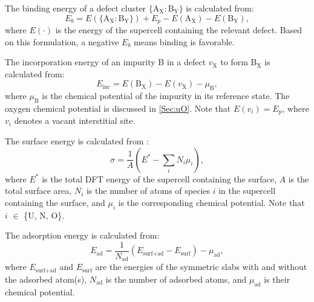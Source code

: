 \documentclass[preprint,12pt,sort&compress]{elsarticle}
\newcommand{\?}{\stackrel{?}{=}}
\begin{document}
The binding energy of a defect cluster $\{\text{A}_\text{X} \! : \! \text{B}_\text{Y}\}$ is calculated from:
\begin{equation}
E_b = E(\{\text{A}_\text{X} \! : \! \text{B}_\text{Y}\}) + E_p - E(\text{A}_\text{X}) - E(\text{B}_\text{Y}),
\end{equation}
where $E(\cdot)$ is the energy of the supercell containing the relevant defect. Based on this formulation, a negative $E_b$ means binding is favorable.

The incorporation energy of an impurity B in a defect $v_\text{X}$ to form B$_\text{X}$ is calculated from:
\begin{equation}
E_\text{inc} = E( \text{B}_\text{X} ) - E( v_\text{X} ) - \mu_\text{B},
\end{equation}
where $\mu_\text{B}$ is the chemical potential of the impurity in its reference state. The oxygen chemical potential is discussed in \cref{Sec:uO}. Note that $E( v_i ) = E_p$, where $v_i$ denotes a vacant interstitial site. %

The surface energy is calculated from \cite{Finnis2005}:
\begin{equation}
\sigma = \frac{1}{A} \left( E^* - \sum_{i} N_i \mu_i \right),
\label{Eq:Sigma}
\end{equation}
where $E^*$ is the total DFT energy of the supercell containing the surface, $A$ is the total surface area, $N_i$ is the number of atoms of species $i$ in the supercell containing the surface, and $\mu_i$ is the corresponding chemical potential. Note that $i$ $\in$ \{U, N, O\}.

The adsorption energy is calculated from:
\begin{equation}
E_\text{ad} = \frac{1}{N_\text{ad}} \left( E_\text{surf+ad} - E_\text{surf} \right) - \mu_\text{ad},
\label{Eq:Ead}
\end{equation}
where $E_\text{surf+ad}$ and $E_\text{surf}$ are the energies of the symmetric slabs with and without the adsorbed atom(s), $N_\text{ad}$ is the number of adsorbed atoms, and $\mu_\text{ad}$ is their chemical potential. 
\end{document}

